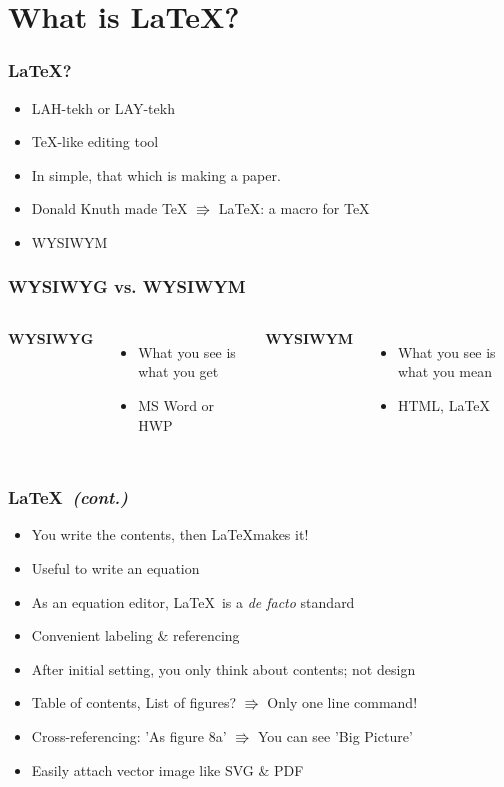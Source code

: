 \documentclass{beamer}
\begin{document}
\section{What is \LaTeX?}

\begin{frame}
    \frametitle{\LaTeX?}
    \begin{itemize}
        \item LAH-tekh or LAY-tekh
        \item TeX-like editing tool
        \item In simple, that which is making a paper.
        \item Donald Knuth made TeX $\Rrightarrow$ \LaTeX: a macro for TeX
        \item WYSIWYM
    \end{itemize}
\end{frame}

\begin{frame}
    \frametitle{WYSIWYG vs. WYSIWYM}
    \begin{columns}[c]
        \textbf{WYSIWYG}
        \begin{itemize}
            \item What you see is what you get
            \item MS Word or HWP
        \end{itemize}
        
        \textbf{WYSIWYM}
        \begin{itemize}
            \item What you see is what you mean
            \item HTML, \LaTeX
        \end{itemize}
    \end{columns}
\end{frame}

\begin{frame}
    \frametitle{\LaTeX\ \textit{(cont.)}}
    \begin{itemize}
        \item You write the contents, then \LaTeX makes it!\
        \item Useful to write an equation
        \item As an equation editor, \LaTeX\ is a \textit{de facto} standard
        \item Convenient labeling \& referencing
        \item After initial setting, you only think about contents; not design
        \item Table of contents, List of figures? $\Rrightarrow$ Only one line command!
        \item Cross-referencing: 'As figure 8a' $\Rrightarrow$ You can see 'Big Picture'
        \item Easily attach vector image like SVG \& PDF
    \end{itemize}
\end{frame}
\end{document}
